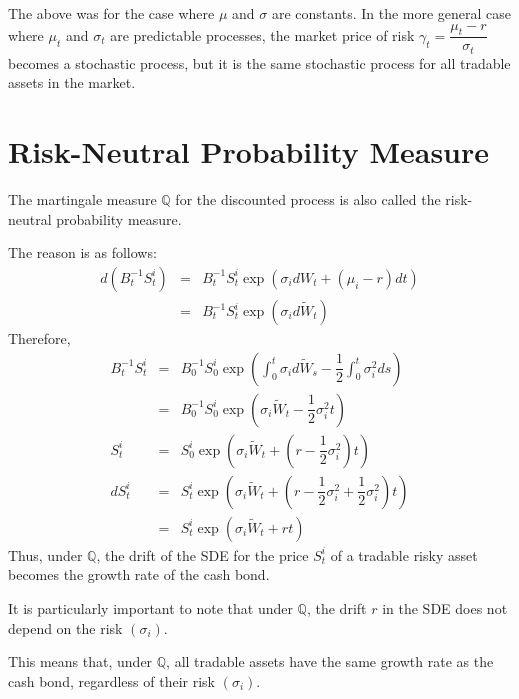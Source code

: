 \documentclass[uplatex,a4j,12pt,dvipdfmx]{jsarticle}
\begin{document}
The above was for the case where $\mu$ and $\sigma$ are constants. In the more general case where $\mu_{t}$ and $\sigma_{t}$ are predictable processes, the market price of risk $\gamma_{t}=\dfrac{\mu_{t} -r}{\sigma_{t}}$ becomes a stochastic process, but it is the same stochastic process for all tradable assets in the market.

\section{Risk-Neutral Probability Measure}

The martingale measure $\mathbb{Q}$ for the discounted process is also called the risk-neutral probability measure.

The reason is as follows:
%
%
\begin{eqnarray*}
	d ( B^{-1}_{t} S^{i}_{t} )
	&=&
	B^{-1}_{t} S^{i}_{t} \exp \left( \sigma_{i} dW_{t} + \left( \mu_{i} - r \right) dt \right)
	\\ &=&
	B^{-1}_{t} S^{i}_{t} \exp \left( \sigma_{i} d \tilde{W}_{t} \right)
\end{eqnarray*}
%
%
Therefore,
%
%
\begin{eqnarray*}
	B^{-1}_{t} S^{i}_{t}
	&=&
	B^{-1}_{0} S^{i}_{0} \exp \left(
	\int^{t}_{0} \sigma_{i} d \tilde{W}_{s}
	- \dfrac{1}{2} \int^{t}_{0} \sigma_{i}^{2} ds
	\right)
	\\ &=&
	B^{-1}_{0} S^{i}_{0} \exp \left(
	\sigma_{i} \tilde{W}_{t}
	- \dfrac{1}{2} \sigma_{i}^{2} t
	\right)
	\\
	S^{i}_{t}
	&=&
	S^{i}_{0} \exp \left(
	\sigma_{i} \tilde{W}_{t}
	+ \left( r - \dfrac{1}{2} \sigma_{i}^{2} \right) t
	\right)
	\\
	d S^{i}_{t}
	&=&
	S^{i}_{t} \exp \left(
	\sigma_{i} \tilde{W}_{t}
	+ \left( r - \dfrac{1}{2} \sigma_{i}^{2} + \dfrac{1}{2} \sigma_{i}^{2} \right) t
	\right)
	\\ &=&
	S^{i}_{t} \exp \left(
	\sigma_{i} \tilde{W}_{t}
	+ r t
	\right)
\end{eqnarray*}
%
%
Thus, under $\mathbb{Q}$, the drift of the SDE for the price $S^{i}_{t}$ of a tradable risky asset becomes the growth rate of the cash bond.

It is particularly important to note that under $\mathbb{Q}$, the drift $r$ in the SDE does not depend on the risk $(\sigma_{i})$.

This means that, under $\mathbb{Q}$, all tradable assets have the same growth rate as the cash bond, regardless of their risk $(\sigma_{i})$.
\end{document}
